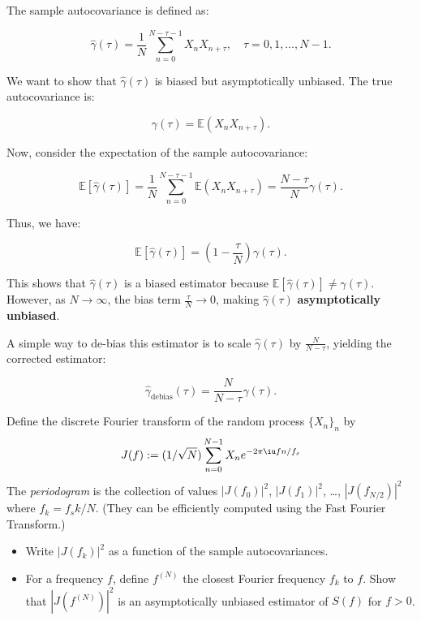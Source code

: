 \documentclass[11pt]{article}
\begin{document}
\begin{solution} %

The sample autocovariance is defined as:

\[
\hat{\gamma}(\tau) = \frac{1}{N} \sum_{n=0}^{N-\tau-1} X_n X_{n+\tau}, \quad \tau = 0, 1, \dots, N-1.
\]

We want to show that \(\hat{\gamma}(\tau)\) is biased but asymptotically unbiased. The true autocovariance is:

\[
\gamma(\tau) = \mathbb{E}(X_n X_{n+\tau}).
\]

Now, consider the expectation of the sample autocovariance:

\[
\mathbb{E}[\hat{\gamma}(\tau)] = \frac{1}{N} \sum_{n=0}^{N-\tau-1} \mathbb{E}(X_n X_{n+\tau}) = \frac{N-\tau}{N} \gamma(\tau).
\]

Thus, we have:

\[
\mathbb{E}[\hat{\gamma}(\tau)] = \left(1 - \frac{\tau}{N}\right) \gamma(\tau).
\]

This shows that \(\hat{\gamma}(\tau)\) is a biased estimator because \(\mathbb{E}[\hat{\gamma}(\tau)] \neq \gamma(\tau)\). However, as \(N \to \infty\), the bias term \(\frac{\tau}{N} \to 0\), making \(\hat{\gamma}(\tau)\) \textbf{asymptotically unbiased}.

A simple way to de-bias this estimator is to scale \(\hat{\gamma}(\tau)\) by \(\frac{N}{N-\tau}\), yielding the corrected estimator:

\[
\hat{\gamma}_{\text{debias}}(\tau) = \frac{N}{N-\tau} \hat{\gamma}(\tau).
\]

\end{solution} %

\begin{exercise}
Define the discrete Fourier transform of the random process $\{X_n\}_n$ by
\begin{equation}
    J(f) := (1/\sqrt{N})\sum_{n=0}^{N-1} X_n e^{-2\pi\iu f n/f_s}
\end{equation}
The \textit{periodogram} is the collection of values $|J(f_0)|^2$, $|J(f_1)|^2$, \dots, $|J(f_{N/2})|^2$ where $f_k = f_s k/N$.
(They can be efficiently computed using the Fast Fourier Transform.)
\begin{itemize}
    \item Write $|J(f_k)|^2$ as a function of the sample autocovariances.
    \item For a frequency $f$, define $f^{(N)}$ the closest Fourier frequency $f_k$ to $f$.
    Show that $|J(f^{(N)})|^2$ is an asymptotically unbiased estimator of $S(f)$ for $f>0$.
\end{itemize}
\end{exercise}
\end{document}
